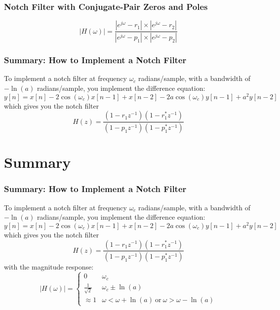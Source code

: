 \documentclass{beamer}
\begin{document}
\begin{frame}
  \frametitle{Notch Filter with Conjugate-Pair Zeros and Poles}
  \begin{displaymath}
    |H(\omega)|=\frac{|e^{j\omega}-r_1|\times|e^{j\omega}-r_2|}{|e^{j\omega}-p_1|\times|e^{j\omega}-p_2|}
  \end{displaymath}
  \centerline{}
\end{frame}

\begin{frame}
  \frametitle{Summary: How to Implement a Notch Filter}

  To implement a notch filter at frequency $\omega_c$ radians/sample,
  with a bandwidth of $-\ln(a)$ radians/sample, you implement the difference equation:
  \begin{displaymath}
    y[n] = x[n]-2\cos(\omega_c)x[n-1]+x[n-2]-2a\cos(\omega_c)y[n-1]+a^2y[n-2]
  \end{displaymath}
  which gives you the notch filter
  \begin{displaymath}
    H(z) = \frac{(1-r_1z^{-1})(1-r_1^*z^{-1})}{(1-p_1z^{-1})(1-p_1^*z^{-1})}
  \end{displaymath}
\end{frame}

\section[Summary]{Summary}
\setcounter{subsection}{1}
  
\begin{frame}
  \frametitle{Summary: How to Implement a Notch Filter}

  To implement a notch filter at frequency $\omega_c$ radians/sample,
  with a bandwidth of $-\ln(a)$ radians/sample, you implement the difference equation:
  \begin{displaymath}
    y[n] = x[n]-2\cos(\omega_c)x[n-1]+x[n-2]-2a\cos(\omega_c)y[n-1]+a^2y[n-2]
  \end{displaymath}
  which gives you the notch filter
  \begin{displaymath}
    H(z) = \frac{(1-r_1z^{-1})(1-r_1^*z^{-1})}{(1-p_1z^{-1})(1-p_1^*z^{-1})}
  \end{displaymath}
  with the magnitude response:
  \begin{displaymath}
    |H(\omega)| =\begin{cases}
    0 & \omega_c\\
    \frac{1}{\sqrt{2}} & \omega_c \pm \ln(a)\\
    \approx 1 & \omega < \omega+\ln(a)~\mbox{or}~\omega > \omega-\ln(a)
    \end{cases}
  \end{displaymath}
\end{frame}
\end{document}
